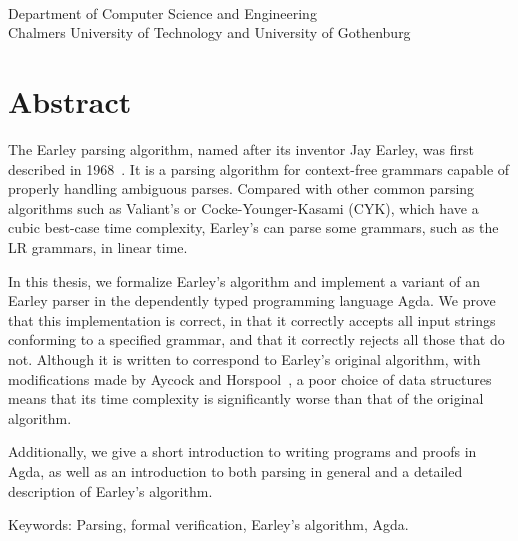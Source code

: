 \titleA{}\\
\titleB{}\\
\me{}\\
Department of Computer Science and Engineering\\
Chalmers University of Technology and University of Gothenburg
\vspace{0.5cm}

\thispagestyle{plain}			%
\vspace{0pt plus 1.0pt}
\section*{Abstract}

The Earley parsing algorithm, named after its inventor Jay Earley, was first
described in 1968~\cite{Earley}. It is a parsing algorithm for context-free
grammars capable of properly handling ambiguous parses. Compared with other
common parsing algorithms such as Valiant's or Cocke-Younger-Kasami (CYK),
which have a cubic best-case time complexity, Earley's can parse some grammars,
such as the LR grammars, in linear time. 


In this thesis, we formalize Earley's algorithm and implement a variant of an
Earley parser in the dependently typed programming language Agda. We prove that
this implementation is correct, in that it correctly accepts all input strings
conforming to a specified grammar, and that it correctly rejects all those that
do not. Although it is written to correspond to Earley's original algorithm,
with modifications made by Aycock and Horspool~\cite{aycock02}, a poor choice
of data structures means that its time complexity is significantly worse than
that of the original algorithm.

Additionally, we give a short introduction to writing programs and proofs in
Agda, as well as an introduction to both parsing in general and a detailed
description of Earley's algorithm.

\vfill
Keywords: Parsing, formal verification, Earley's algorithm, Agda.

\newpage				%
\thispagestyle{empty}
\mbox{}
